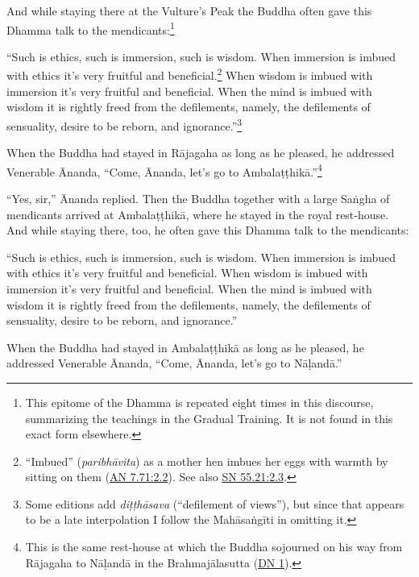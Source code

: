 \documentclass[12pt,openany]{book}%
\begin{document}
And while staying there at the Vulture’s Peak the Buddha often gave this Dhamma talk to the mendicants:\footnote{This epitome of the Dhamma is repeated eight times in this discourse, summarizing the teachings in the Gradual Training. It is not found in this exact form elsewhere. } 

“Such is ethics, such is immersion, such is wisdom. When immersion is imbued with ethics it’s very fruitful and beneficial.\footnote{“Imbued” (\textit{\textsanskrit{paribhāvita}}) as a mother hen imbues her eggs with warmth by sitting on them (\href{https://suttacentral.net/an7.71/en/sujato\#2.2}{AN 7.71:2.2}). See also \href{https://suttacentral.net/sn55.21/en/sujato\#2.3}{SN 55.21:2.3}. } When wisdom is imbued with immersion it’s very fruitful and beneficial. When the mind is imbued with wisdom it is rightly freed from the defilements, namely, the defilements of sensuality, desire to be reborn, and ignorance.”\footnote{Some editions add \textit{\textsanskrit{diṭṭhāsava}} (“defilement of views”), but since that appears to be a late interpolation I follow the \textsanskrit{Mahāsaṅgīti} in omitting it. } 

When the Buddha had stayed in \textsanskrit{Rājagaha} as long as he pleased, he addressed Venerable Ānanda, “Come, Ānanda, let’s go to \textsanskrit{Ambalaṭṭhikā}.”\footnote{This is the same rest-house at which the Buddha sojourned on his way from \textsanskrit{Rājagaha} to \textsanskrit{Nāḷandā} in the \textsanskrit{Brahmajālasutta} (\href{https://suttacentral.net/dn1/en/sujato}{DN 1}). } 

“Yes, sir,” Ānanda replied. Then the Buddha together with a large \textsanskrit{Saṅgha} of mendicants arrived at \textsanskrit{Ambalaṭṭhikā}, where he stayed in the royal rest-house. And while staying there, too, he often gave this Dhamma talk to the mendicants: 

“Such is ethics, such is immersion, such is wisdom. When immersion is imbued with ethics it’s very fruitful and beneficial. When wisdom is imbued with immersion it’s very fruitful and beneficial. When the mind is imbued with wisdom it is rightly freed from the defilements, namely, the defilements of sensuality, desire to be reborn, and ignorance.” 

When the Buddha had stayed in \textsanskrit{Ambalaṭṭhikā} as long as he pleased, he addressed Venerable Ānanda, “Come, Ānanda, let’s go to \textsanskrit{Nāḷandā}.” 
\end{document}
